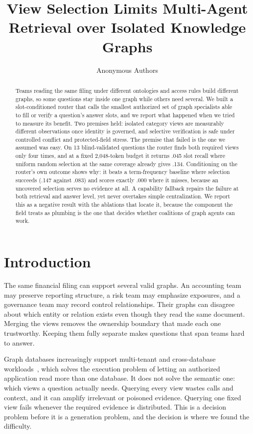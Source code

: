 \documentclass{article}
\title[View Selection Limits Multi-Agent Graph Retrieval]{View Selection Limits Multi-Agent Retrieval over Isolated Knowledge Graphs}
\author[Anonymous Authors]{Anonymous Authors}
\begin{document}
\maketitle

\begin{abstract}
Teams reading the same filing under different ontologies and access rules build different graphs, so some questions stay inside one graph while others need several. We built a slot-conditioned router that calls the smallest authorized set of graph specialists able to fill or verify a question's answer slots, and we report what happened when we tried to measure its benefit. Two premises held: isolated category views are measurably different observations once identity is governed, and selective verification is safe under controlled conflict and protected-field stress. The premise that failed is the one we assumed was easy. On 13 blind-validated questions the router finds both required views only four times, and at a fixed 2{,}048-token budget it returns .045 slot recall where uniform random selection at the same coverage already gives .134. Conditioning on the router's own outcome shows why: it beats a term-frequency baseline where selection succeeds (.147 against .083) and scores exactly .000 where it misses, because an uncovered selection serves no evidence at all. A capability fallback repairs the failure at both retrieval and answer level, yet never overtakes simple centralization. We report this as a negative result with the ablations that locate it, because the component the field treats as plumbing is the one that decides whether coalitions of graph agents can work.
\end{abstract}

\section{Introduction}
The same financial filing can support several valid graphs. An accounting team may preserve reporting structure, a risk team may emphasize exposures, and a governance team may record control relationships. Their graphs can disagree about which entity or relation exists even though they read the same document. Merging the views removes the ownership boundary that made each one trustworthy. Keeping them fully separate makes questions that span teams hard to answer.

Graph databases increasingly support multi-tenant and cross-database workloads~\citep{memgraph2026}, which solves the execution problem of letting an authorized application read more than one database. It does not solve the semantic one: which views a question actually needs. Querying every view wastes calls and context, and it can amplify irrelevant or poisoned evidence. Querying one fixed view fails whenever the required evidence is distributed. This is a decision problem before it is a generation problem, and the decision is where we found the difficulty.
\end{document}
